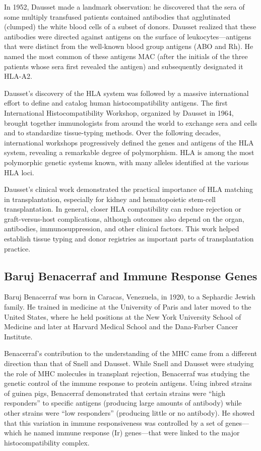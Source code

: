 In 1952, Dausset made a landmark observation: he discovered that the sera of some multiply transfused patients contained antibodies that agglutinated (clumped) the white blood cells of a subset of donors. Dausset realized that these antibodies were directed against antigens on the surface of leukocytes---antigens that were distinct from the well-known blood group antigens (ABO and Rh). He named the most common of these antigens MAC (after the initials of the three patients whose sera first revealed the antigen) and subsequently designated it HLA-A2.

Dausset's discovery of the HLA system was followed by a massive international effort to define and catalog human histocompatibility antigens. The first International Histocompatibility Workshop, organized by Dausset in 1964, brought together immunologists from around the world to exchange sera and cells and to standardize tissue-typing methods. Over the following decades, international workshops progressively defined the genes and antigens of the HLA system, revealing a remarkable degree of polymorphism. HLA is among the most polymorphic genetic systems known, with many alleles identified at the various HLA loci.

Dausset's clinical work demonstrated the practical importance of HLA matching in transplantation, especially for kidney and hematopoietic stem-cell transplantation. In general, closer HLA compatibility can reduce rejection or graft-versus-host complications, although outcomes also depend on the organ, antibodies, immunosuppression, and other clinical factors. This work helped establish tissue typing and donor registries as important parts of transplantation practice.

\subsection{Baruj Benacerraf and Immune Response Genes}

Baruj Benacerraf was born in Caracas, Venezuela, in 1920, to a Sephardic Jewish family. He trained in medicine at the University of Paris and later moved to the United States, where he held positions at the New York University School of Medicine and later at Harvard Medical School and the Dana-Farber Cancer Institute.

Benacerraf's contribution to the understanding of the MHC came from a different direction than that of Snell and Dausset. While Snell and Dausset were studying the role of MHC molecules in transplant rejection, Benacerraf was studying the genetic control of the immune response to protein antigens. Using inbred strains of guinea pigs, Benacerraf demonstrated that certain strains were ``high responders'' to specific antigens (producing large amounts of antibody) while other strains were ``low responders'' (producing little or no antibody). He showed that this variation in immune responsiveness was controlled by a set of genes---which he named immune response (Ir) genes---that were linked to the major histocompatibility complex.


